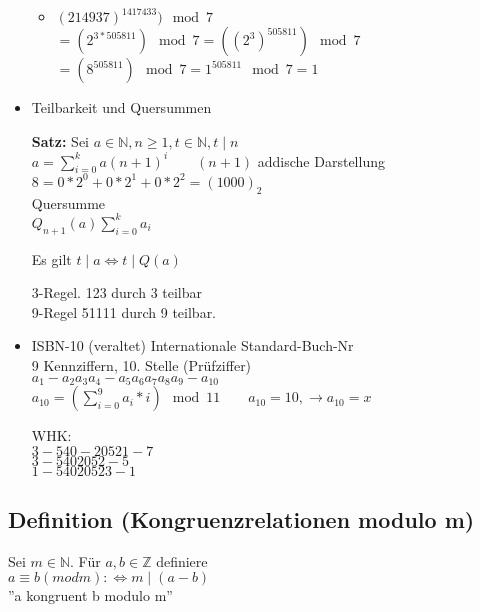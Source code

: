 \documentclass[a4paper, 12pt, twoside] {article}
\begin{document}
\begin{itemize}
\begin{itemize}
 \item $(214937)^1417433) \mod 7$ \\
 $=(2^{3* 505811}) \mod 7 = ((2^3)^{505811}) \mod 7$ \\
 $=(8^{505811}) \mod 7 = 1^{505811} \mod 7 = 1$

 \end{itemize}

 \item Teilbarkeit und Quersummen

 \textbf{Satz:} Sei $ a \in \mathbb{N}, n \geq 1, t \in \mathbb{N}, t \mid n$ \\
$a = \displaystyle\sum^{k}_{i = 0} a (n+1)^i \qquad (n+1)$ addische Darstellung \\

$8 = 0*2^0 + 0*2^1 + 0*2^2 = (1000)_2$ \\

Quersumme \\
$Q_{n+1} (a) \displaystyle\sum^{k}_{i=0} a_i$

Es gilt $t \mid a \Leftrightarrow t \mid Q(a)$

3-Regel. 123 durch 3 teilbar \\
9-Regel 51111 durch 9 teilbar.

\item ISBN-10 (veraltet) %
Internationale Standard-Buch-Nr \\
9 Kennziffern, 10. Stelle (Prüfziffer) \\
$a_1 - a_2 a_3 a_4 - a_5 a_6 a_7 a_8 a_9 - a_10$ \\

$a_10 = (\displaystyle\sum^{9}_{i=0} a_i * i) \mod 11 \qquad a_10 = 10, \rightarrow a_10 = x$

WHK: \\
$3-540-20521-7$ \\
$3-5402052-5$ \\
$1-54020523-1$

\end{itemize}

\subsection{Definition (Kongruenzrelationen modulo m)} %
Sei $m \in \mathbb{N}$. Für $a, b \in \mathbb{Z}$ definiere \\
$a \equiv b (mod m) : \Leftrightarrow m \mid (a-b)$ \\

''a kongruent b modulo m''
\end{document}
